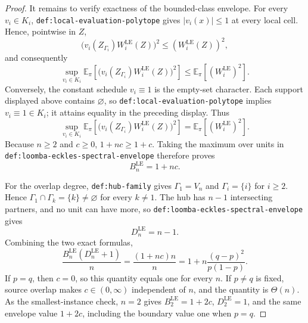 \documentclass{article}
\begin{document}
\begin{proof}
It remains to verify exactness of the bounded-class envelope.  For every \(v_i\in K_i\), \texttt{def:local-evaluation-polytope} gives \(|v_i(x)|\le1\) at every local cell.  Hence, pointwise in \(Z\),
\[
 \bigl(v_i(Z_{\Gamma_i})W_i^{\mathrm{LE}}(Z)\bigr)^2
 \le (W_i^{\mathrm{LE}}(Z))^2,
\]
and consequently
\[
 \sup_{v_i\in K_i}\mathbb E_{\pi}\!\left[
   \bigl(v_i(Z_{\Gamma_i})W_i^{\mathrm{LE}}(Z)\bigr)^2
 \right]
 \le \mathbb E_{\pi}\!\left[(W_i^{\mathrm{LE}})^2\right].
\]
Conversely, the constant schedule \(v_i\equiv1\) is the empty-set character.  Each support displayed above contains \(\varnothing\), so \texttt{def:local-evaluation-polytope} implies \(v_i\equiv1\in K_i\); it attains equality in the preceding display.  Thus
\[
 \sup_{v_i\in K_i}\mathbb E_{\pi}\!\left[
   \bigl(v_i(Z_{\Gamma_i})W_i^{\mathrm{LE}}(Z)\bigr)^2
 \right]
 =\mathbb E_{\pi}\!\left[(W_i^{\mathrm{LE}})^2\right].
\]
Because \(n\ge2\) and \(c\ge0\), \(1+nc\ge1+c\).  Taking the maximum over units in \texttt{def:loomba-eckles-spectral-envelope} therefore proves
\[
 B_n^{\mathrm{LE}}=1+nc.
\]

For the overlap degree, \texttt{def:hub-family} gives \(\Gamma_1=V_n\) and \(\Gamma_i=\{i\}\) for \(i\ge2\).  Hence \(\Gamma_1\cap\Gamma_k=\{k\}\ne\varnothing\) for every \(k\ne1\).  The hub has \(n-1\) intersecting partners, and no unit can have more, so \texttt{def:loomba-eckles-spectral-envelope} gives
\[
 D_n^{\mathrm{LE}}=n-1.
\]
Combining the two exact formulas,
\[
 \frac{B_n^{\mathrm{LE}}(D_n^{\mathrm{LE}}+1)}{n}
 =\frac{(1+nc)n}{n}
 =1+n\frac{(q-p)^2}{p(1-p)}.
\]
If \(p=q\), then \(c=0\), so this quantity equals one for every \(n\).  If \(p\ne q\) is fixed, source overlap makes \(c\in(0,\infty)\) independent of \(n\), and the quantity is \(\Theta(n)\).  As the smallest-instance check, \(n=2\) gives \(B_2^{\mathrm{LE}}=1+2c\), \(D_2^{\mathrm{LE}}=1\), and the same envelope value \(1+2c\), including the boundary value one when \(p=q\).
\end{proof}
\end{document}
